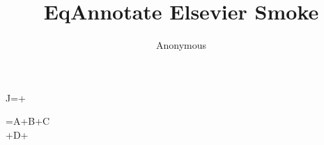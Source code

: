 \documentclass[preprint,12pt]{elsarticle}
\begin{document}
\begin{frontmatter}\title{EqAnnotate Elsevier Smoke}\author{Anonymous}\end{frontmatter}
\begin{annotatedequation}[numbered]
J=+\lambda{}\label{eq:els}
\end{annotatedequation}

\begin{annotatedmultline}
=A+B+C\\
{}+D+
\end{annotatedmultline}
\end{document}
